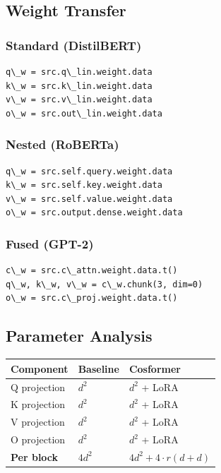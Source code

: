 \subsection{Weight Transfer}

\subsubsection{Standard (DistilBERT)}

\begin{lstlisting}
q\_w = src.q\_lin.weight.data
k\_w = src.k\_lin.weight.data
v\_w = src.v\_lin.weight.data
o\_w = src.out\_lin.weight.data
\end{lstlisting}

\subsubsection{Nested (RoBERTa)}

\begin{lstlisting}
q\_w = src.self.query.weight.data
k\_w = src.self.key.weight.data
v\_w = src.self.value.weight.data
o\_w = src.output.dense.weight.data
\end{lstlisting}

\subsubsection{Fused (GPT-2)}

\begin{lstlisting}
c\_w = src.c\_attn.weight.data.t()
q\_w, k\_w, v\_w = c\_w.chunk(3, dim=0)
o\_w = src.c\_proj.weight.data.t()
\end{lstlisting}

\subsection{Parameter Analysis}

\begin{table}[H]
\centering
\small
\begin{tabular}{lll}
\toprule
\textbf{Component} & \textbf{Baseline} & \textbf{Cosformer} \\
\midrule
Q projection & $d^2$ & $d^2$ + LoRA \\
K projection & $d^2$ & $d^2$ + LoRA \\
V projection & $d^2$ & $d^2$ + LoRA \\
O projection & $d^2$ & $d^2$ + LoRA \\
\textbf{Per block} & $4d^2$ & $4d^2 + 4 \cdot r(d + d)$ \\
\bottomrule
\end{tabular}
\end{table}

